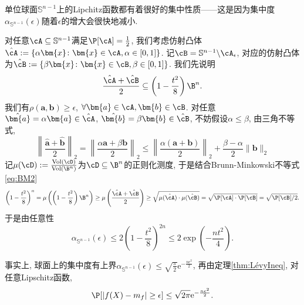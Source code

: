 \begin{example}[单位球面上的Lévy集中度]
	单位球面$\mathbb{S}^{n-1}$上的Lipchitz函数都有着很好的集中性质——这是因为集中度$\alpha_{\mathbb{S}^{n-1}}(\epsilon)$随着$\epsilon$的增大会很快地减小. 
	
	对任意$\cA \subseteq \mathbb{S}^{n-1}$满足$\P[\cA] = \frac{1}{2}$, 我们考虑仿射凸体$\hat \cA := \{\alpha \bm{x} \colon \bm{x} \in \cA, \alpha \in [0,1] \}$. 
	记$\cB = \mathbb{S}^{n-1} \backslash \cA_{\epsilon}$, 对应的仿射凸体为$\hat \cB := \{\beta \bm{x} \colon \bm{x} \in \cB, \beta \in [0,1] \}$. 
	我们先说明
	\begin{equation*}
		\frac{\hat{\cA} + \hat{\cB}}{2} \subseteq \left(1 - \frac{t^2}{8} \right) \B^n. 
	\end{equation*}
	我们有$\rho(\bm{a}, \bm{b}) \geq \epsilon$, $\forall \bm{a} \in \cA, \bm{b} \in \cB$. 
	对任意$\hat{\bm{a}} = \alpha \bm{a} \in \hat{\cA}$, $\hat{\bm{b}} = \beta \bm{b} \in \hat{\cB}$, 不妨假设$\alpha \leq \beta$, 由三角不等式,
	\begin{equation*}
		\left\| \frac{\hat{\bm{a}} + \hat{\bm{b}}}{2} \right\|_2
		= \left\| \frac{\alpha \bm{a} + \beta \bm{b}}{2} \right\|_2 
		\leq \left\| \frac{\alpha(\bm{a} + \bm{b})}{2} \right\|_2 + \frac{\beta - \alpha}{2} \|\bm{b}\|_2
	\end{equation*}
	记$\mu(\cD) := \frac{\vol(\cD)}{\vol(\B^n)}$为$\cD \subseteq \B^n$的正则化测度, 于是结合Brunn-Minkowski不等式\eqref{eq:BM2}
	\begin{equation*}
		\left(1 - \frac{t^2}{8} \right)^n 
		= \mu \left(\left(1 - \frac{t^2}{8} \right) \B^n\right)
		\geq \mu\left(\frac{\hat{\cA} + \hat{\cB}}{2}\right)
		\geq \sqrt{\mu(\hat{\cA}) \cdot \mu(\hat{\cB})}
		= \sqrt{\P[\cA] \cdot \P[\cB]}
		= \sqrt{\P[\cB] / 2}. 
	\end{equation*}
	于是由任意性
	\begin{equation*}
		\alpha_{\mathbb{S}^{n-1}}(\epsilon)
		\leq 2 \left(1 - \frac{t^2}{8} \right)^{2n}
		\leq 2 \exp\left( - \frac{n t^2}{4} \right). 
	\end{equation*}
	
	事实上, 球面上的集中度有上界$\alpha_{\mathbb{S}^{n-1}}(\epsilon) \leq \sqrt{\frac{\pi}{2}} \mathrm{e}^{-\frac{n \epsilon^2}{2}}$, 再由定理\ref{thm:LévyIneq}, 对任意Lipschitz函数, 
	\begin{equation*}
		\P[|f(X) - m_f| \geq \epsilon] \leq \sqrt{2 \pi} \mathrm{e}^{-\frac{n \epsilon^2}{2}}. 
	\end{equation*} 
	

\end{example}
